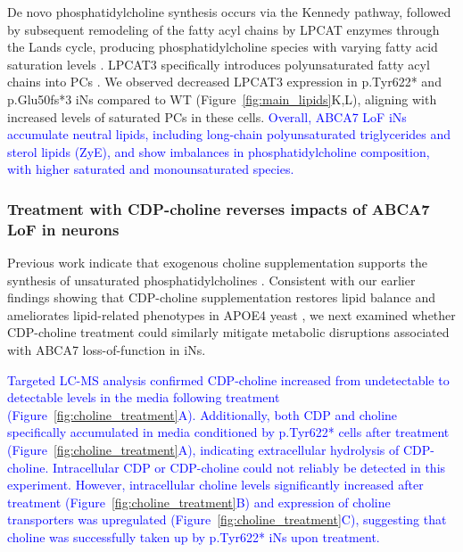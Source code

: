 De novo phosphatidylcholine synthesis occurs via the Kennedy pathway, followed by subsequent remodeling of the fatty acyl chains by LPCAT enzymes through the Lands cycle, producing phosphatidylcholine species with varying fatty acid saturation levels \cite{Boumann2003-ew;Wang2019-om}. LPCAT3 specifically introduces polyunsaturated fatty acyl chains into PCs \cite{Zhao2008-pq}. We observed decreased LPCAT3 expression in p.Tyr622* and p.Glu50fs*3 iNs compared to WT (Figure~\ref{fig:main_lipids}K,L), aligning with increased levels of saturated PCs in these cells. \newcommand{\quoteH}{\textcolor{blue}{Overall, ABCA7 LoF iNs accumulate neutral lipids, including long-chain polyunsaturated triglycerides and sterol lipids (ZyE), and show imbalances in phosphatidylcholine composition, with higher saturated and monounsaturated species. \label{quoteH-label}}}
\quoteH


\subsubsection{Treatment with CDP-choline reverses impacts of ABCA7 LoF in neurons}
Previous work indicate that exogenous choline supplementation supports the synthesis of unsaturated phosphatidylcholines \cite{Boumann2003-ew}. Consistent with our earlier findings showing that CDP-choline supplementation restores lipid balance and ameliorates lipid-related phenotypes in APOE4 yeast \cite{Sienski2021-zt}, we next examined whether CDP-choline treatment could similarly mitigate metabolic disruptions associated with ABCA7 loss-of-function in iNs.

\newcommand{\quoteD}{\textcolor{blue}{Targeted LC-MS analysis confirmed CDP-choline increased from undetectable to detectable levels in the media following treatment (Figure~\ref{fig:choline_treatment}A). Additionally, both CDP and choline specifically accumulated in media conditioned by p.Tyr622* cells after treatment (Figure~\ref{fig:choline_treatment}A), indicating extracellular hydrolysis of CDP-choline. Intracellular CDP or CDP-choline could not reliably be detected  in this experiment. However, intracellular choline levels significantly increased after treatment (Figure~\ref{fig:choline_treatment}B) and expression of choline transporters was upregulated (Figure~\ref{fig:choline_treatment}C), suggesting that choline was successfully taken up by p.Tyr622* iNs upon treatment.\label{quoteD-label}}} 
\quoteD

